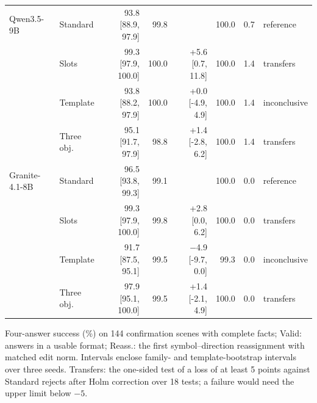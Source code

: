 \begin{table}[!htbp]
\begin{tabular*}{\linewidth}{@{\extracolsep{\fill}}llrrrrrl@{}}
\addlinespace[2pt]
Qwen3.5-9B & Standard & 93.8 [88.9, 97.9] & 99.8 &  & 100.0 & 0.7 & reference \\
 & Slots & 99.3 [97.9, 100.0] & 100.0 & +5.6 [0.7, 11.8] & 100.0 & 1.4 & transfers \\
 & Template & 93.8 [88.2, 97.9] & 100.0 & +0.0 [-4.9, 4.9] & 100.0 & 1.4 & inconclusive \\
 & Three obj. & 95.1 [91.7, 97.9] & 98.8 & +1.4 [-2.8, 6.2] & 100.0 & 1.4 & transfers \\
\addlinespace[2pt]
Granite-4.1-8B & Standard & 96.5 [93.8, 99.3] & 99.1 &  & 100.0 & 0.0 & reference \\
 & Slots & 99.3 [97.9, 100.0] & 99.8 & +2.8 [0.0, 6.2] & 100.0 & 0.0 & transfers \\
 & Template & 91.7 [87.5, 95.1] & 99.5 & $-$4.9 [-9.7, 0.0] & 99.3 & 0.0 & inconclusive \\
 & Three obj. & 97.9 [95.1, 100.0] & 99.5 & +1.4 [-2.1, 4.9] & 100.0 & 0.0 & transfers \\
\bottomrule
\end{tabular*}
\par\vspace{3pt}
{\footnotesize\raggedright Four-answer success (\%) on 144 confirmation scenes with complete facts; Valid: answers in a usable format; Reass.: the first symbol--direction reassignment with matched edit norm. Intervals enclose family- and template-bootstrap intervals over three seeds. Transfers: the one-sided test of a loss of at least 5 points against Standard rejects after Holm correction over 18 tests; a failure would need the upper limit below $-5$.\par}
\end{table}
